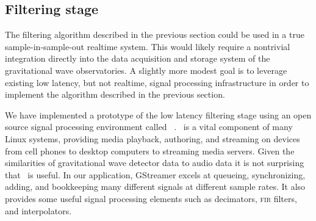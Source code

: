 \subsection{Filtering stage}

The filtering algorithm described in the previous section could be used in a
true sample-in-sample-out realtime system.  This would likely require a
nontrivial integration directly into the data acquisition and storage system of
the gravitational wave observatories.  A slightly more modest goal is to leverage
existing low latency, but not realtime, signal processing infrastructure in
order to implement the algorithm described in the previous section.   

We have implemented a prototype of the low latency filtering stage using an
open source signal processing environment called \gstreamer\ \cite{gstreamer}.
\gstreamer\ is a vital component of many Linux systems, providing media
playback, authoring, and streaming on devices from cell phones to desktop
computers to streaming media servers.  Given the similarities of gravitational
wave detector data to audio data it is not surprising that \gstreamer\ is
useful.  In our application, GStreamer excels at queueing, synchronizing,
adding, and bookkeeping many different signals at different sample rates.  It
also provides some useful signal processing elements such as decimators,
\textsc{fir} filters, and interpolators.  

